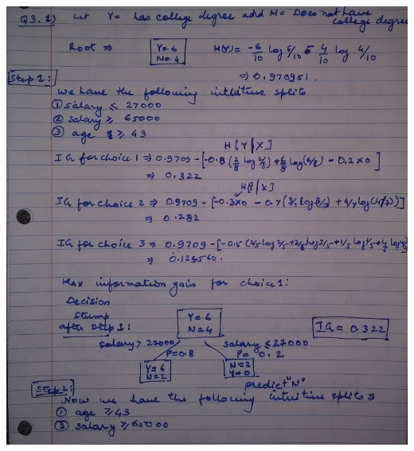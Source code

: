 \documentclass[letterpaper]{article}
\begin{document}
\subsection{}
\begin{center}
\includegraphics[width = 6in]{13.png}
\end{center}
\end{document}

